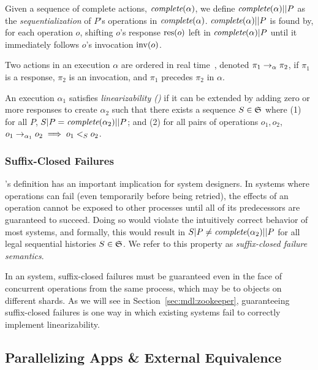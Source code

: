 Given a sequence of complete actions,
$\operatorname*{\textit{complete}}(\alpha)$, we define $\operatorname*{\textit{complete}}(\alpha)||P$ as the
\textit{sequentialization} of $P$'s operations in $\operatorname*{\textit{complete}}(\alpha)$.
$\operatorname*{\textit{complete}}(\alpha)||P$ is found by, for each operation $o$, shifting $o$'s response
$\operatorname{res}(o)$ left in $\operatorname*{\textit{complete}}(\alpha)|P$ until it immediately follows $o$'s
invocation $\operatorname{inv}(o)$.

Two actions in an execution $\alpha$ are
ordered in real time~\cite{herlihy1990linearizability}, denoted
$\pi_1 \rightarrow_\alpha \pi_2$, if $\pi_1$ is a response, $\pi_2$ is an
invocation, and $\pi_1$ precedes $\pi_2$ in $\alpha$.

 An execution $\alpha_1$ satisfies \textit{\multidispatch{} linearizability (\MDL{})} if it
can be extended by adding zero or more responses to create $\alpha_2$ such that
there exists a sequence $S \in \mathfrak{S}$ where (1) for all $P$,
$S|P = \operatorname*{\textit{complete}}(\alpha_2)||P$; and (2) for all pairs of operations
$o_1,o_2$, $o_1 \rightarrow_{\alpha_1} o_2 \implies o_1 <_S o_2$.

\subsubsection{Suffix-Closed Failures}
\label{sec:mdl:def:failures}

\MDL{}'s definition has an important implication for system designers.
In systems where operations can fail (even temporarily before being retried), the
effects of an operation cannot be exposed to other processes until all of its 
predecessors are guaranteed to succeed. Doing so would violate the intuitively
correct behavior of most systems, and formally, this would result in
$S|P \neq \operatorname*{\textit{complete}}(\alpha_2)||P$ for all legal sequential histories
$S \in \mathfrak{S}$. We refer to this property as \textit{suffix-closed failure semantics}.

In an \MDL{} system, suffix-closed failures must be guaranteed even in the
face of concurrent operations from the same process, which may be to
objects on different shards. As we will see in Section~\ref{sec:mdl:zookeeper},
guaranteeing suffix-closed failures is one way in which existing systems fail
to correctly implement \multidispatch{} linearizability.  

\subsection{Parallelizing Apps \& External Equivalence}
\label{sec:mdl:equivalence}

